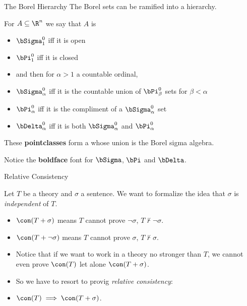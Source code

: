 \begin{frame}{The Borel Hierarchy}
The Borel sets can be ramified into a hierarchy.

\pause

For $A\subseteq \R^{n}$ we say that $A$ is

\begin{itemize}
\item  $\bSigma^0_1$ iff it is open
\item  $\bPi^0_1$ iff it is closed
\item and then for $\alpha > 1$ a countable ordinal,
\item $\bSigma^0_{\alpha}$ iff it is the countable union of
       $\bPi^0_{\beta}$ sets for $\beta < \alpha$
\item $\bPi^0_{\alpha}$ iff it is the compliment of a
      $\bSigma^0_{\alpha}$ set
\item $\bDelta^0_{\alpha}$ iff it is both
      $\bSigma^0_{\alpha}$ and $\bPi^0_{\alpha}$
\end{itemize}

\begin{fact}
These \textbf{pointclasses} form a  whose union
is the Borel sigma algebra.
\end{fact}

\begin{remark}
Notice the \textbf{boldface} font for $\bSigma$, $\bPi$ and $\bDelta$.
\end{remark}

\end{frame}

\begin{frame}{Relative Consistency}

Let $T$ be a theory and $\sigma$ a sentence. We want to formalize the
idea that $\sigma$ is \emph{independent} of $T$.

\begin{itemize}
\item $\con(T + \sigma)$ means $T$ cannot prove $\neg\sigma$, $T\not\vdash\neg\sigma$.
\item $\con(T + \neg\sigma)$ means $T$ cannot prove $\sigma$, $T\not\vdash\sigma$.
\item Notice that if we want to work in  a theory no stronger than $T$,
we cannot even prove $\con(T)$ let alone $\con(T + \sigma)$.
\item So we have to resort to provig \emph{relative consistency}:
\item $\con(T) \implies \con(T + \sigma)$.
\end{itemize}

\end{frame}
